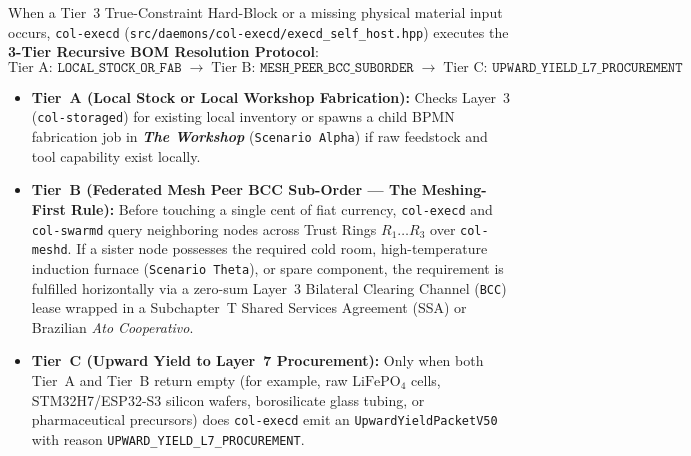 When a Tier~3 True-Constraint Hard-Block or a missing physical material input occurs, \texttt{col-execd} (\texttt{src/daemons/col-execd/execd\_self\_host.hpp}) executes the \textbf{3-Tier Recursive BOM Resolution Protocol}:
\begin{equation}
\text{Tier A: }\texttt{LOCAL\_STOCK\_OR\_FAB} \;\longrightarrow\; \text{Tier B: }\texttt{MESH\_PEER\_BCC\_SUBORDER} \;\longrightarrow\; \text{Tier C: }\texttt{UPWARD\_YIELD\_L7\_PROCUREMENT}
\label{eq:ch6-three-tier-bom}
\end{equation}

\begin{itemize}
    \item \textbf{Tier~A (Local Stock or Local Workshop Fabrication):} Checks Layer~3 (\texttt{col-storaged}) for existing local inventory or spawns a child BPMN fabrication job in \textbf{\textit{The Workshop}} (\texttt{Scenario Alpha}) if raw feedstock and tool capability exist locally.
    \item \textbf{Tier~B (Federated Mesh Peer BCC Sub-Order --- The Meshing-First Rule):} Before touching a single cent of fiat currency, \texttt{col-execd} and \texttt{col-swarmd} query neighboring nodes across Trust Rings $R_1 \dots R_3$ over \texttt{col-meshd}. If a sister node possesses the required cold room, high-temperature induction furnace (\texttt{Scenario Theta}), or spare component, the requirement is fulfilled horizontally via a zero-sum Layer~3 Bilateral Clearing Channel (\texttt{BCC}) lease wrapped in a Subchapter~T Shared Services Agreement (SSA) or Brazilian \textit{Ato Cooperativo}.
    \item \textbf{Tier~C (Upward Yield to Layer~7 Procurement):} Only when both Tier~A and Tier~B return empty (for example, raw $\mathrm{LiFePO_4}$ cells, STM32H7/ESP32-S3 silicon wafers, borosilicate glass tubing, or pharmaceutical precursors) does \texttt{col-execd} emit an \texttt{UpwardYieldPacketV50} with reason \texttt{UPWARD\_YIELD\_L7\_PROCUREMENT}.
\end{itemize}


